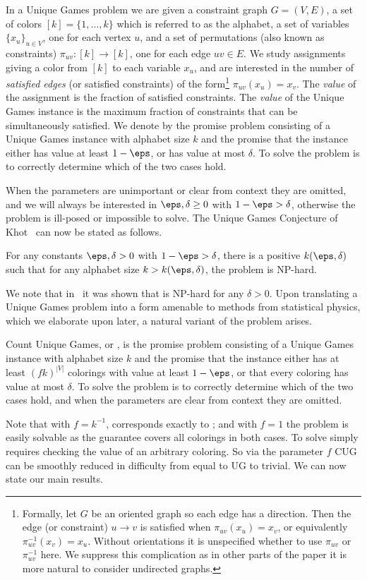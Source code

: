 \begin{definition}
In a Unique Games problem we are given a constraint graph $G = (V,E)$, a set of colors $[k] = \{1,\dotsc,k\}$ which is referred to as the alphabet, a set of variables $\{x_u\}_{u\in V}$, one for each vertex $u$, and a set of permutations (also known as constraints) $\pi_{uv} : [k]\to [k]$, one for each edge $uv\in E$. 
We study assignments giving a color from $[k]$ to each variable $x_u$, and are interested in the number of \emph{satisfied edges} (or satisfied constraints) of the form\footnote{Formally, let $G$ be an oriented graph so each edge has a direction. Then the edge (or constraint) $u\to v$ is satisfied when $\pi_{uv}(x_u)=x_v$, or equivalently $\pi_{uv}^{-1}(x_v)=x_u$. Without orientations it is unspecified whether to use $\pi_{uv}$ or $\pi_{uv}^{-1}$ here. We suppress this complication as in other parts of the paper it is more natural to consider undirected graphs.} $\pi_{uv}(x_u)=x_v$. The \emph{value} of the assignment is the fraction of satisfied constraints. 
The \emph{value} of the Unique Games instance is the maximum fraction of constraints that can be simultaneously satisfied.
%
We denote by  the promise problem consisting of a Unique Games instance with alphabet size $k$ and the promise that the instance either has value at least $1-\eps$, or has value at most $\delta$. 
To solve the problem is to correctly determine which of the two cases hold. 
\end{definition}
%
When the parameters are unimportant or clear from context they are omitted, and we will always be interested in $\eps,\delta\ge 0$ with $1-\eps > \delta$, otherwise the problem is ill-posed or impossible to solve. 
The Unique Games Conjecture of Khot~\cite{Khot02a} can now be stated as follows.
%
\begin{conjecture*}[UGC]
For any constants $\eps,\delta > 0$ with $1-\eps>\delta$, there is a positive $k(\eps,\delta)$ such that for any alphabet size $k > k(\eps, \delta)$, the problem  is NP-hard.
\end{conjecture*}
\noindent
We note that in~\cite{DKKMS18a,DKKMS18} it was shown that  is NP-hard for any $\delta>0$.
%
Upon translating a Unique Games problem into a form amenable to methods from statistical physics, which we elaborate upon later, a natural variant of the problem arises.
%
\begin{definition}
Count Unique Games, or , is the promise problem consisting of a Unique Games instance with alphabet size $k$ and the promise that the instance either has at least $(fk)^{|V|}$ colorings with value at least $1-\eps$, or that every coloring has value at most $\delta$. 
To solve the problem is to correctly determine which of the two cases hold, and when the parameters are clear from context they are omitted. 
\end{definition}
%
Note that with $f=k^{-1}$,  corresponds exactly to ; and with $f=1$ the problem is easily solvable as the guarantee covers all colorings in both cases. To solve  simply requires checking the value of an arbitrary coloring.
So via the parameter $f$ CUG can be smoothly reduced in difficulty from equal to UG to trivial. We can now state our main results.
%
